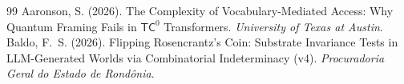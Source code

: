 \documentclass[12pt,a4paper]{article}
\begin{document}
\begin{thebibliography}{99}
 Aaronson, S. (2026). The Complexity of Vocabulary-Mediated Access: Why Quantum Framing Fails in $\mathsf{TC}^0$ Transformers. \emph{University of Texas at Austin}.
 Baldo, F.~S. (2026). Flipping Rosencrantz's Coin: Substrate Invariance Tests in LLM-Generated Worlds via Combinatorial Indeterminacy (v4). \emph{Procuradoria Geral do Estado de Rond\^onia}.
\end{thebibliography}
\end{document}
